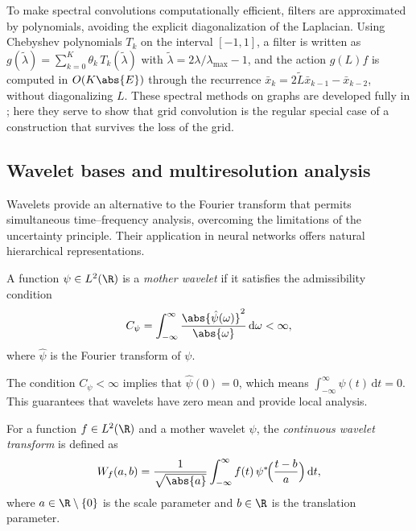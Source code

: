 To make spectral convolutions computationally efficient, filters are
approximated by polynomials, avoiding the explicit diagonalization of the
Laplacian. Using Chebyshev polynomials $T_k$ on the interval $[-1, 1]$, a filter
is written as $g(\tilde{\lambda}) = \sum_{k=0}^K \theta_k\, T_k(\tilde{\lambda})$
with $\tilde{\lambda} = 2\lambda/\lambda_{\max} - 1$, and the action $g(L)f$ is
computed in $O(K\abs{E})$ through the recurrence
$\bar{x}_k = 2\tilde{L}\bar{x}_{k-1} - \bar{x}_{k-2}$, without diagonalizing $L$.
These spectral methods on graphs are developed fully in ; here
they serve to show that grid convolution is the regular special case of a
construction that survives the loss of the grid.

\subsection{Wavelet bases and multiresolution analysis}
\label{sec:grids:wavelets}

Wavelets provide an alternative to the Fourier transform that permits
simultaneous time--frequency analysis, overcoming the limitations of the
uncertainty principle. Their application in neural networks offers natural
hierarchical representations.

\begin{definition}
\label{def:grids:mother-wavelet}
A function $\psi \in L^2(\R)$ is a \emph{mother wavelet} if it satisfies the
admissibility condition
\[
  C_\psi = \int_{-\infty}^{\infty} \frac{\abs{\hat{\psi}(\omega)}^2}{\abs{\omega}}\, \mathrm{d}\omega < \infty,
\]
where $\hat{\psi}$ is the Fourier transform of $\psi$.
\end{definition}

The condition $C_\psi < \infty$ implies that $\hat{\psi}(0) = 0$, which means
$\int_{-\infty}^{\infty} \psi(t)\, \mathrm{d}t = 0$. This guarantees that
wavelets have zero mean and provide local analysis.

\begin{definition}
\label{def:grids:cwt}
For a function $f \in L^2(\R)$ and a mother wavelet $\psi$, the \emph{continuous
wavelet transform} is defined as
\[
  W_f(a, b) = \frac{1}{\sqrt{\abs{a}}} \int_{-\infty}^{\infty} f(t)\,
    \psi^*\!\Big(\frac{t-b}{a}\Big)\, \mathrm{d}t,
\]
where $a \in \R\setminus\{0\}$ is the scale parameter and $b \in \R$ is the
translation parameter.
\end{definition}

